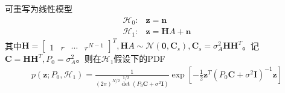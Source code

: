 \documentclass[fontset=windows]{article}
\numberwithin{figure}{section}
\begin{document}
可重写为线性模型
\begin{align*}
	\mathcal{H}_0: & \mathbf{z}=\mathbf{n}             \\
	\mathcal{H}_1: & \mathbf{z}=\mathbf{H}A+\mathbf{n}
\end{align*}
其中\(\mathbf{H}=\begin{bmatrix}1&r&\cdots&r^{N-1}\end{bmatrix}^T,\mathbf{H}A\sim\mathcal{N}(\mathbf{0},\mathbf{C}_s),\mathbf{C}_s=\sigma^2_A\mathbf{HH}^T\)。记\(\mathbf{C}=\mathbf{HH}^T,P_0=\sigma^2_A\)。则在\(\mathcal{H}_1\)假设下的PDF
\begin{align*}
	p(\mathbf{z};P_0,\mathcal{H}_1)
	=\frac{1}{(2\pi )^{N/2}\det^{1/2}(P_0\mathbf{C}+\sigma^2\mathbf{I})}
	\exp\left[-\frac{1}{2}\mathbf{z}^T(P_0\mathbf{C}+\sigma^2\mathbf{I})^{-1}\mathbf{z}\right]
\end{align*}
\end{document}
